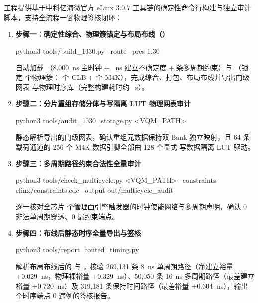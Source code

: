 工程提供基于中科亿海微官方 eLinx 3.0.7 工具链的确定性命令行构建与独立审计脚本，支持全流程一键物理签核闭环：

\begin{enumerate}[leftmargin=2em,itemsep=3pt]
  \item \textbf{步骤一：确定性综合、物理簇锚定与布局布线（）}
\begin{runcommand}
python3 tools/build_1030.py --route --pres 1.30
\end{runcommand}
    自动加载 （8.000~ns 主时钟 + \ClkUncert~ns 建立不确定度 + \MulticycleRules{} 条多周期约束）与 （锁定 \LockedClusters{} 个物理簇：\Clb{} 个 CLB + \Mem{} 个 M4K），完成综合、打包、布局布线并导出门级网表  与物理时序库（完整构建耗时约 \ParElapsedSec~s）。
  \item \textbf{步骤二：分片重组存储分体与写隔离 LUT 物理网表审计}
\begin{runcommand}
python3 tools/audit_1030_storage.py <VQM_PATH>
\end{runcommand}
    静态解析导出的门级网表，确认重组元数据保持双 Bank 独立映射，且 64 条载荷通道的 256 个 M4K 数据引脚全部由 128 个显式  写数据隔离 LUT 驱动。
  \item \textbf{步骤三：多周期路径约束合法性全量审计}
\begin{runcommand}
python3 tools/check_multicycle.py <VQM_PATH> --constraints elinx/constraints.edc --output out/multicycle_audit
\end{runcommand}
    逐一核对全芯片 \MulticycleRegs{} 个管理面引擎触发器的时钟使能网络与多周期声明，确认 0 非法单周期穿透、0 漏约束端点。
  \item \textbf{步骤四：布线后静态时序全量导出与签核}
\begin{runcommand}
python3 tools/report_routed_timing.py
\end{runcommand}
    解析布局布线后的  与 ，核验 269,131 条 8~ns 单周期路径（净建立裕量 $+0.029$~ns，物理裸裕量 $+0.329$~ns）、50,050 条 16~ns 多周期路径（最差建立裕量 $+0.720$~ns）及 319,181 条保持时间路径（最差裕量 $+0.604$~ns），输出 \RoutedEndpoints{} 个时序端点 0 违例的签核报告。
\end{enumerate}
